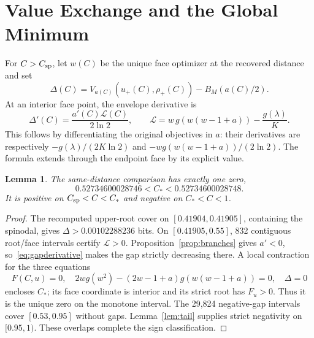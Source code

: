 \documentclass[12pt,letterpaper,onecolumn]{article}
\newtheorem{lemma}[theorem]{Lemma}
\theoremstyle{definition}
\begin{document}
\section{Value Exchange and the Global Minimum}\label{sec:comparison}
For \(C>C_{\rm sp}\), let \(w(C)\) be the unique face optimizer at the recovered distance and set
\[
\Delta(C)=V_{a(C)}(u_+(C),\rho_+(C))-B_M(a(C)/2).
\]
At an interior face point, the envelope derivative is
\begin{equation}\label{eq:gapderivative}
\Delta'(C)=\frac{a'(C)\mathcal L(C)}{2\ln2},\qquad
\mathcal L=w\,g(w(w-1+a))-\frac{g(\lambda)}K.
\end{equation}
This follows by differentiating the original objectives in \(a\):
their derivatives are respectively \(-g(\lambda)/(2K\ln2)\) and
\(-wg(w(w-1+a))/(2\ln2)\).
The formula extends through the endpoint face by its explicit value.

\begin{lemma}\label{lem:values}
The same-distance comparison has exactly one zero,
\[
0.52734600028746<C_*<0.52734600028748.
\]
It is positive on \(C_{\rm sp}<C<C_*\) and negative on \(C_*<C<1\).
\end{lemma}
\begin{proof}
The recomputed upper-root cover on \([0.41904,0.41905]\), containing the spinodal, gives
\(\Delta>0.00102288236\) bits.
On \([0.41905,0.55]\), 832 contiguous root/face intervals certify
\(\mathcal L>0\). Proposition~\ref{prop:branches} gives \(a'<0\), so~\eqref{eq:gapderivative} makes the gap strictly decreasing there.
A local contraction for the three equations
\[
F(C,u)=0,\quad
2wg(w^2)-(2w-1+a)g(w(w-1+a))=0,\quad
\Delta=0
\]
encloses \(C_*\); its face coordinate is interior and its strict root has \(F_u>0\).
Thus it is the unique zero on the monotone interval.
The 29,824 negative-gap intervals cover \([0.53,0.95]\) without gaps.
Lemma~\ref{lem:tail} supplies strict negativity on \([0.95,1)\).
These overlaps complete the sign classification.
\end{proof}
\end{document}
